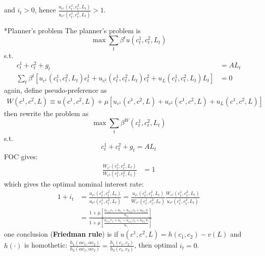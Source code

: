 \documentclass[10pt,landscape,a4paper]{article}
\makeatletter
\renewcommand{\subsection}{\@startsection{subsection}{1}{0mm}{.2ex}{.2ex}{\small\bfseries}}
\makeatother
\begin{document}
\begin{multicols*}{3}
and $i_t>0$, hence $\frac{u_{c^1}(c_t^1,c_t^2,L_t)}{u_{c^2}(c_t^1,c_t^2,L_t)}>1$.

\subsection*{Planner's problem}
The planner's problem is 
$$
\max \sum_t\beta^t u(c_t^1,c_t^2,L_t)
$$
s.t.
\begin{align*}
    c^1_t + c_t^2 + g_t &= AL_t\\
    \sum_t\beta^t \left[ u_{c^1}(c_t^1,c_t^2,L_t)c_t^1+ u_{c^2}(c_t^1,c_t^2,L_t)c_t^2 + u_{L}(c_t^1,c_t^2,L_t)L_t \right]&=0
\end{align*}
again, define pseudo-preference as
\begin{align*}
    W(c^1,c^2,L) \equiv u(c^1,c^2,L)+\mu\left[u_{c^1}(c^1,c^2,L)+u_{c^2}(c^1,c^2,L)+u_L(c^1,c^2,L)\right]
\end{align*}
then rewrite the problem as 
$$
\max \sum_t \beta^ W(c^1_t,c^2_t,L_t)
$$
s.t. 
$$
c_t^1+c_t^2+g_t = AL_t
$$
FOC gives:
\begin{align*}
    \frac{W_{c^1}(c^1_t,c^2_t,L_t)}{W_{c^2}(c^1_t,c^2_t,L_t)} &= 1
\end{align*}
which gives the optimal nominal interest rate:
\begin{align*}
    1+i_t &= \frac{u_{c^1}(c^1_t,c^2_t,L_t)}{u_{c^2}(c^1_t,c^2_t,L_t)} = \frac{u_{c^1}(c^1_t,c^2_t,L_t)}{W_{c^1}(c^1_t,c^2_t,L_t)}\frac{W_{c^2}(c^1_t,c^2_t,L_t)}{u_{c^2}(c^1_t,c^2_t,L_t)}\\
    &= \frac{1+\mu\left[\frac{u_{c_1c_2}c_1+u_{c_2}+u_{c_2c_2}c_2+u_{Lc_2}L}{u_{c_2}}\right]}{1+\mu\left[\frac{u_{c_1c_1}c_1+u_{c_1}+u_{c_2c_1}c_2+u_{Lc_1}L}{u_{c_1}}\right]}
\end{align*}
one conclusion (\textbf{\color{myred}Friedman rule}) is if $u(c^1,c^2,L)=h(c_1,c_2)-v(L)$ and $h(\cdot)$ is homothetic: $\frac{h_1(\alpha c_1,\alpha c_2)}{h_2(\alpha c_1,\alpha c_2)}=\frac{h_1(c_1,c_2)}{h_2(c_1,c_2)}$, then optimal $i_t = 0$.


\end{multicols*}
\end{document}
